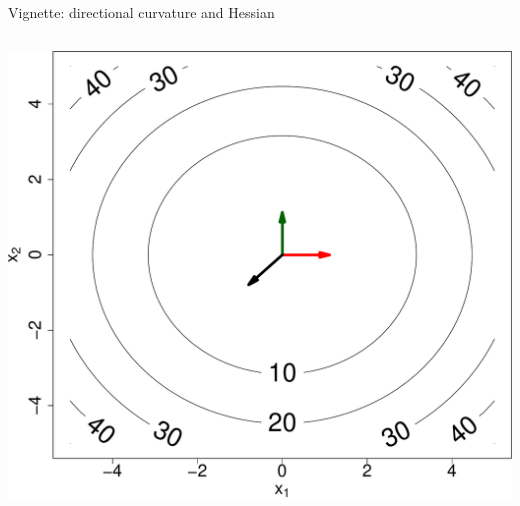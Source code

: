 \documentclass[ignorenonframetext,aspectratio=169]{beamer}
\begin{document}
\begin{frame}{Vignette: directional curvature and Hessian}
\begin{columns}
\begin{column}{0.35\textwidth}
\begin{center}\includegraphics[height=0.4\textheight]{lecture9_files/figure-beamer/unnamed-chunk-5-1} \end{center}
\end{column}
\end{columns}

\end{frame}
\end{document}
